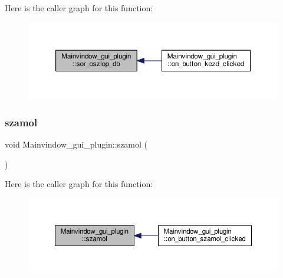 Here is the caller graph for this function\+:\nopagebreak
\begin{figure}[H]
\begin{center}
\leavevmode
\includegraphics[width=350pt]{classMainvindow__gui__plugin_adb6c0d468163f8192f2138b15a6c43e9_icgraph}
\end{center}
\end{figure}
\mbox{\label{classMainvindow__gui__plugin_ae7b7382ef0b52b1116426d3fc9c78caa}} 
\subsubsection{\texorpdfstring{szamol}{szamol}}
{\footnotesize\ttfamily void Mainvindow\+\_\+gui\+\_\+plugin\+::szamol (\begin{DoxyParamCaption}{ }\end{DoxyParamCaption})\hspace{0.3cm}{\ttfamily [signal]}}

Here is the caller graph for this function\+:\nopagebreak
\begin{figure}[H]
\begin{center}
\leavevmode
\includegraphics[width=350pt]{classMainvindow__gui__plugin_ae7b7382ef0b52b1116426d3fc9c78caa_icgraph}
\end{center}
\end{figure}
\mbox{\label{classMainvindow__gui__plugin_a2fe7a4a60ee4e4f61579ccc717e8258d}} 

